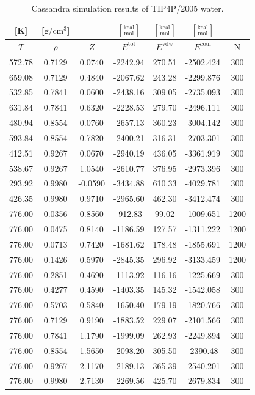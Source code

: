 \documentclass[%
 aip,
 jcp,
 sd,%
 amsmath,amssymb,
]{revtex4-1}
\begin{document}
\begin{table}[!htbp]
\centering
\caption{Cassandra simulation results of TIP4P/2005 water. }
\label{tab:NIST-VAL-C12-FTT}
\begin{ruledtabular}
\begin{tabular}{ccccccc}
[K] & [$\mathrm{g/cm^3}$] &  & $[\frac{\mathrm{kcal}}{\mathrm{mol}}]$ & $[\frac{\mathrm{kcal}}{\mathrm{mol}}]$ & $[\frac{\mathrm{kcal}}{\mathrm{mol}}]$ &  \\
\hline
$T$ & $\rho$ & $Z$ & $E^{\mathrm{tot}}$ & $E^{\mathrm{vdw}}$ & $E^{\mathrm{coul}}$  & N\\
\hline
572.78 & 0.7129 & 0.0740  & -2242.94 & 270.51 & -2502.424 & 300  \\
659.08 & 0.7129 & 0.4840  & -2067.62 & 243.28 & -2299.876 & 300  \\
532.85 & 0.7841 & 0.0600  & -2438.16 & 309.05 & -2735.093 & 300  \\
631.84 & 0.7841 & 0.6320  & -2228.53 & 279.70 & -2496.111 & 300  \\
480.94 & 0.8554 & 0.0760  & -2657.13 & 360.23 & -3004.142 & 300  \\
593.84 & 0.8554 & 0.7820  & -2400.21 & 316.31 & -2703.301 & 300  \\
412.51 & 0.9267 & 0.0670  & -2940.19 & 436.05 & -3361.919 & 300  \\
538.67 & 0.9267 & 1.0540  & -2610.77 & 376.95 & -2973.396 & 300  \\
293.92 & 0.9980 & -0.0590 & -3434.88 & 610.33 & -4029.781 & 300  \\
426.35 & 0.9980 & 0.9710  & -2965.60 & 462.30 & -3412.474 & 300  \\
776.00 & 0.0356 & 0.8560  & -912.83  & 99.02  & -1009.651 & 1200 \\
776.00 & 0.0475 & 0.8140  & -1186.59 & 127.57 & -1311.222 & 1200 \\
776.00 & 0.0713 & 0.7420  & -1681.62 & 178.48 & -1855.691 & 1200 \\
776.00 & 0.1426 & 0.5970  & -2845.35 & 296.92 & -3133.459 & 1200 \\
776.00 & 0.2851 & 0.4690  & -1113.92 & 116.16 & -1225.669 & 300  \\
776.00 & 0.4277 & 0.4590  & -1403.35 & 145.32 & -1542.058 & 300  \\
776.00 & 0.5703 & 0.5840  & -1650.40 & 179.19 & -1820.766 & 300  \\
776.00 & 0.7129 & 0.9190  & -1883.52 & 229.07 & -2101.566 & 300  \\
776.00 & 0.7841 & 1.1790  & -1999.09 & 262.93 & -2249.894 & 300  \\
776.00 & 0.8554 & 1.5650  & -2098.20 & 305.50 & -2390.48  & 300  \\
776.00 & 0.9267 & 2.1170  & -2189.13 & 365.39 & -2540.201 & 300  \\
776.00 & 0.9980 & 2.7130  & -2269.56 & 425.70 & -2679.834 & 300
\end{tabular}
\end{ruledtabular}
\end{table}
\end{document}

